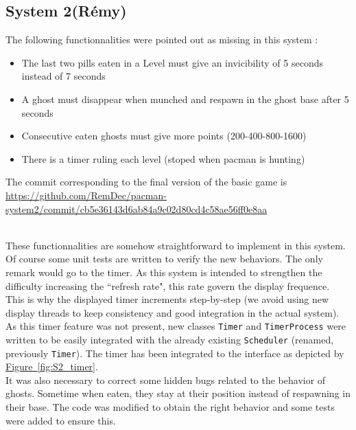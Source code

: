 \documentclass[]{article}
\newcommand{\wordlink}[2]{\hyperref[#2]{#1~\ref{#2}}}
\begin{document}
\subsection{System 2(Rémy)}

The following functionnalities were pointed out as missing in this system :

\begin{itemize}
\item The last two pills eaten in a Level must give an invicibility of 5 seconds instead of 7 seconds
\item A ghost must disappear when munched and respawn in the ghost base after 5 seconds
\item Consecutive eaten ghosts must give more points (200-400-800-1600)
\item There is a timer ruling each level (stoped when pacman is hunting)
\end{itemize}

\vspace{0.2cm}

The commit corresponding to the final version of the basic game is \\

\url{https://github.com/RemDec/pacman-system2/commit/cb5e36143d6ab84a9c02d80cd4c58ae56ff0e8aa}

 ~\\

These functionnalities are somehow straightforward to implement in this system. Of course some unit tests are written to verify the new behaviors. The only remark would go to the timer. As this system is intended to strengthen the difficulty increasing the ``refresh rate", this rate govern the display frequence. This is why the displayed timer increments step-by-step (we avoid using new display threads to keep consistency and good integration in the actual system). As this timer feature was not present, new classes \texttt{Timer} and \texttt{TimerProcess} were written to be easily integrated with the already existing \texttt{Scheduler} (renamed, previously \texttt{Timer}). The timer has been integrated to the interface as depicted by \wordlink{Figure}{fig:S2_timer}.\\

It was also necessary to correct some hidden bugs related to the behavior of ghosts. Sometime when eaten, they stay at their position instead of respawning in their base. The code was modified to obtain the right behavior and some tests were added to ensure this. \\
\end{document}
